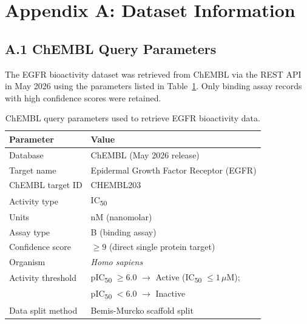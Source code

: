 
\clearpage
\section*{Appendix A: Dataset Information}
\label{app:dataset}

\subsection*{A.1 ChEMBL Query Parameters}

The EGFR bioactivity dataset was retrieved from ChEMBL
\parencite{mendez2019chembl} via the REST API in May 2026 using the parameters
listed in Table~\ref{tab:app_chembl_query}. Only binding assay
records with high confidence scores were retained.

\begin{table}[H]
\caption{ChEMBL query parameters used to retrieve EGFR
         bioactivity data.}
\label{tab:app_chembl_query}
\centering
\begin{tabular}{@{}p{5cm}p{8cm}@{}}
\toprule
\textbf{Parameter} & \textbf{Value} \\
\midrule
Database           & ChEMBL (May 2026 release) \\
Target name        & Epidermal Growth Factor Receptor (EGFR) \\
ChEMBL target ID   & CHEMBL203 \\
Activity type      & IC\textsubscript{50} \\
Units              & nM (nanomolar) \\
Assay type         & B (binding assay) \\
Confidence score   & $\geq 9$ (direct single protein target) \\
Organism           & \textit{Homo sapiens} \\
Activity threshold & pIC\textsubscript{50} $\geq 6.0$
                     $\rightarrow$ Active
                     (IC\textsubscript{50} $\leq 1\,\mu$M);\\
                   & pIC\textsubscript{50} $< 6.0$
                     $\rightarrow$ Inactive \\
Data split method  & Bemis-Murcko scaffold split \\
\bottomrule
\end{tabular}
\end{table}

